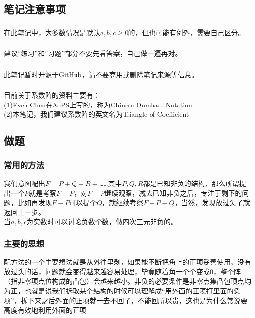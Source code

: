 \documentclass[UTF8]{ctexart}
\begin{document}
\subsection{笔记注意事项}
\subsubsection{}在此笔记中，大多数情况是默认$ a,b,c\geq 0 $的，但也可能有例外，需要自己区分。
\subsubsection{}建议“练习”和“习题”部分不要先看答案，自己做一遍再对。
\subsubsection{}
此笔记暂时开源于\href{https://github.com/Raymond0Hui/LaTeXwork-open}{GitHub}，请不要商用或删除笔记来源等信息。
\subsubsection{}
目前关于系数阵的资料主要有：\\
(1)Even Chen在AoPS上写的，称为Chinese Dumbass Notation\\
(2)本笔记，我们建议系数阵的英文名为Triangle of Coefficient
\subsection{做题}
\subsubsection{常用的方法}
我们意图配出$ F=P+Q+R+ $……其中$ P,Q,R $都是已知非负的结构，那么所谓提出一个$ P $就是考察$ F-P $，对$ F-P $继续观察，减去已知非负之后，专注于剩下的问题，比如再发现$ F-P $可以提个$ Q $，就继续考察$ F-P-Q $，当然，发现放过头了就返回上一步。\\
当$ a,b,c $为实数时可以讨论负数个数，做四次三元非负的。
\subsubsection{主要的思想}
配方法的一个主要想法就是从外往里剥，如果能不断把角上的正项妥善使用，没有放过头的话，问题就会变得越来越容易处理，毕竟随着角一个个变成0，整个阵（指非零项点位构成的凸包）会越来越小。非负的必要条件是非零点集凸包顶点均为正，也就是说我们拆取某个结构的时候可以理解成“用外面的正项打里面的负项”，拆下来之后外面的正项就一去不回了，不能回所以贵，这也是为什么常说要高度有效地利用外面的正项
\end{document}
